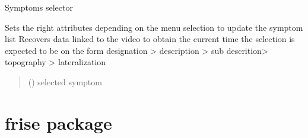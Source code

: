 \documentclass[letterpaper,10pt,english]{sphinxmanual}
\begin{document}
\begin{fulllineitems}
\begin{fulllineitems}
\begin{quote}
\begin{description}
\end{description}\end{quote}

\end{fulllineitems}


\begin{fulllineitems}
\label{\detokenize{general_interface:general_interface.Menu_symptomes.on_select}}
\pysigstartsignatures
{}
\pysigstopsignatures
\sphinxAtStartPar
Symptoms selector

\sphinxAtStartPar
Sets the right attributes depending on the menu selection to update the symptom list
Recovers data linked to the video to obtain the current time
the selection is expected to be on the form
designation \textgreater{} description \textgreater{} sub descrition\textgreater{} topography \textgreater{} lateralization
\begin{quote}\begin{description}
\sphinxAtStartPar
{} () \textendash{} selected symptom

\end{description}\end{quote}

\end{fulllineitems}


\begin{fulllineitems}
\label{\detokenize{general_interface:general_interface.Menu_symptomes.on_select_bar}}
\pysigstartsignatures
{}
\pysigstopsignatures
\end{fulllineitems}


\end{fulllineitems}


\sphinxstepscope


\chapter{frise package}
\label{\detokenize{frise:frise-package}}\label{\detokenize{frise::doc}}
\end{document}
